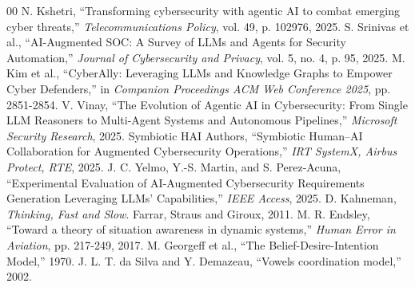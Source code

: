 \documentclass[journal]{IEEEtran}
\begin{document}
\begin{thebibliography}{00}
 N. Kshetri, ``Transforming cybersecurity with agentic AI to combat emerging cyber threats,'' \emph{Telecommunications Policy}, vol. 49, p. 102976, 2025.
 S. Srinivas et al., ``AI-Augmented SOC: A Survey of LLMs and Agents for Security Automation,'' \emph{Journal of Cybersecurity and Privacy}, vol. 5, no. 4, p. 95, 2025.
 M. Kim et al., ``CyberAlly: Leveraging LLMs and Knowledge Graphs to Empower Cyber Defenders,'' in \emph{Companion Proceedings ACM Web Conference 2025}, pp. 2851-2854.
 V. Vinay, ``The Evolution of Agentic AI in Cybersecurity: From Single LLM Reasoners to Multi-Agent Systems and Autonomous Pipelines,'' \emph{Microsoft Security Research}, 2025.
 Symbiotic HAI Authors, ``Symbiotic Human--AI Collaboration for Augmented Cybersecurity Operations,'' \emph{IRT SystemX, Airbus Protect, RTE}, 2025.
 J. C. Yelmo, Y.-S. Martin, and S. Perez-Acuna, ``Experimental Evaluation of AI-Augmented Cybersecurity Requirements Generation Leveraging LLMs' Capabilities,'' \emph{IEEE Access}, 2025.
 D. Kahneman, \emph{Thinking, Fast and Slow}. Farrar, Straus and Giroux, 2011.
 M. R. Endsley, ``Toward a theory of situation awareness in dynamic systems,'' \emph{Human Error in Aviation}, pp. 217-249, 2017.
 M. Georgeff et al., ``The Belief-Desire-Intention Model,'' 1970.
 J. L. T. da Silva and Y. Demazeau, ``Vowels coordination model,'' 2002.
\end{thebibliography}
\end{document}
